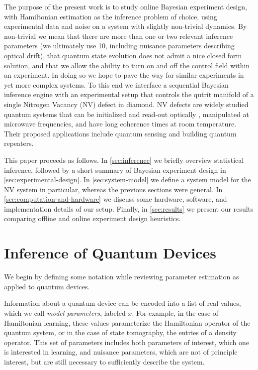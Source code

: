 \documentclass[aps,nofootinbib,twocolumn,superscriptaddress]{revtex4}
\newcommand{\mps}{x}
\begin{document}
The purpose of the present work is to study
online Bayesian experiment design, with Hamiltonian estimation
as the inference problem of choice, using experimental data and noise on
a system with slightly non-trivial dynamics.
By non-trivial we mean that there are more than one or two
relevant inference parameters (we ultimately use 10, including nuisance
parameters describing optical drift), that
quantum state evolution does not admit a nice closed form
solution, and that we allow the ability to turn
on and off the control field within an experiment.
In doing so we hope to pave the way for similar experiments in
yet more complex systems.
To this end we interface a sequential Bayesian inference engine with
an experimental setup that controls the qutrit manifold of a single Nitrogen
Vacancy (NV) defect in diamond.
NV defects are widely studied quantum systems that can
be initialized and read-out optically
\cite{
    gruber_scanning_1997,
    jelezko_readout_2004,
    harrison_optical_2004},
manipulated at microwave frequencies\cite{jelezko_observation_2004},
and have long coherence times at room temperature\cite{balasubramanian_ultralong_2009}.
Their proposed applications include quantum sensing
\cite{
    dolde_electricfield_2011,
    acosta_temperature_2010,
    rondin_magnetometry_2014a}
and building quantum repeaters\cite{childress_faulttolerant_2006}.

This paper proceeds as follows.
In \autoref{sec:inference} we briefly overview statistical
inference, followed by a short summary of Bayesian experiment
design in \autoref{sec:experimental-design}.
In \autoref{sec:system-model} we define a system model for
the NV system in particular, whereas the previous sections
were general.
In \autoref{sec:computation-and-hardware} we discuss some
hardware, software, and implementation details of our setup.
Finally, in \autoref{sec:results} we present our results
comparing offline and online experiment design heuristics.

\section{Inference of Quantum Devices}
\label{sec:inference}

We begin by defining some notation while reviewing parameter
estimation as applied to quantum devices.

Information about a quantum device can be encoded into a list of
real values, which we call \textit{model parameters}, labeled $\mps$.
For example, in the case of Hamiltonian learning,
these values parameterize the Hamiltonian operator of the
quantum system, or in the case of
state tomography, the entries of a density operator.
This set of parameters includes both parameters of interest, which
one is interested in learning, and nuisance parameters, which are
not of principle interest, but are still necessary to sufficiently
describe the system.
\end{document}
